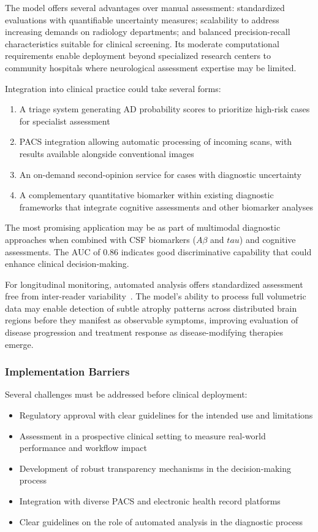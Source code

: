 \documentclass[12pt, a4paper]{article}
\begin{document}
The model offers several advantages over manual assessment: standardized evaluations with quantifiable uncertainty measures; scalability to address increasing demands on radiology departments; and balanced precision-recall characteristics suitable for clinical screening. Its moderate computational requirements enable deployment beyond specialized research centers to community hospitals where neurological assessment expertise may be limited.

Integration into clinical practice could take several forms:
\begin{enumerate}
    \item A triage system generating AD probability scores to prioritize high-risk cases for specialist assessment
    \item PACS integration allowing automatic processing of incoming scans, with results available alongside conventional images
    \item An on-demand second-opinion service for cases with diagnostic uncertainty
    \item A complementary quantitative biomarker within existing diagnostic frameworks that integrate cognitive assessments and other biomarker analyses
\end{enumerate}

The most promising application may be as part of multimodal diagnostic approaches when combined with CSF biomarkers ($A\beta$ and $tau$) and cognitive assessments. The AUC of 0.86 indicates good discriminative capability that could enhance clinical decision-making.

For longitudinal monitoring, automated analysis offers standardized assessment free from inter-reader variability~\cite{kloppel2008accuracy}. The model's ability to process full volumetric data may enable detection of subtle atrophy patterns across distributed brain regions before they manifest as observable symptoms, improving evaluation of disease progression and treatment response as disease-modifying therapies emerge.

\subsubsection{Implementation Barriers}

Several challenges must be addressed before clinical deployment:

\begin{itemize}
    \item Regulatory approval with clear guidelines for the intended use and limitations
    \item Assessment in a prospective clinical setting to measure real-world performance and workflow impact
    \item Development of robust transparency mechanisms in the decision-making process
    \item Integration with diverse PACS and electronic health record platforms
    \item Clear guidelines on the role of automated analysis in the diagnostic process
\end{itemize}
\end{document}
